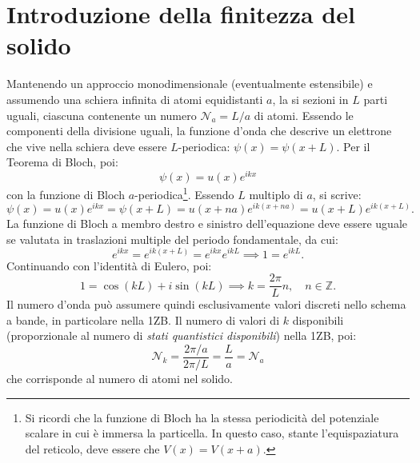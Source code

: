 \documentclass[a4paper,11pt]{report}
\begin{document}
\section{Introduzione della finitezza del solido}
Mantenendo un approccio monodimensionale (eventualmente estensibile) e assumendo una schiera infinita di atomi equidistanti $a$, la si sezioni in $L$ parti uguali, ciascuna contenente un numero $\mathcal{N}_a = L/a$ di atomi. Essendo le componenti della divisione uguali, la funzione d'onda che descrive un elettrone che vive nella schiera deve essere $L$-periodica: $\psi(x) = \psi(x+L)$. Per il Teorema di Bloch, poi:
\begin{equation}
    \psi(x) = u(x)e^{ikx}
\end{equation}
con la funzione di Bloch $a$-periodica\footnote{Si ricordi che la funzione di Bloch ha la stessa periodicità del potenziale scalare in cui è immersa la particella. In questo caso, stante l'equispaziatura del reticolo, deve essere che $V(x) = V(x + a)$.}. Essendo $L$ multiplo di $a$, si scrive:
\begin{equation}
     \psi(x) = u(x)e^{ikx} = \psi(x+L) = u(x+na)e^{ik(x+na)} = u(x+L)e^{ik(x+L)}. 
\end{equation}
La funzione di Bloch a membro destro e sinistro dell'equazione deve essere uguale se valutata in traslazioni multiple del periodo fondamentale, da cui:
\begin{equation}
e^{ikx} = e^{ik(x+L)} = e^{ikx}e^{ikL} \implies 1 = e^{ikL}.
\end{equation}
Continuando con l'identità di Eulero, poi:
\begin{equation}
1 = \cos(kL)+i\sin(kL) \implies k = \frac{2\pi}{L} n, \quad n \in \mathbb{Z}.
\end{equation}
Il numero d'onda può assumere quindi esclusivamente valori discreti nello schema a bande, in particolare nella 1ZB. Il numero di valori di $k$ disponibili (proporzionale al numero di \textit{stati quantistici disponibili}) nella 1ZB, poi:
\begin{equation}
\mathcal{N}_k = \frac{2\pi/a}{2\pi/L} = \frac{L}{a} = \mathcal{N}_a
\end{equation}
che corrisponde al numero di atomi nel solido.
\end{document}
